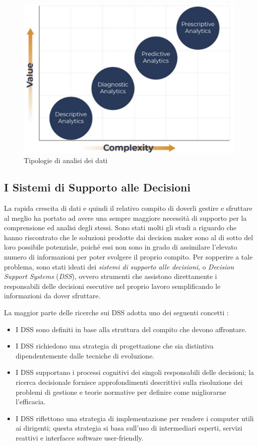 \begin{figure}[H]
    \centering
    \includegraphics[width=0.75\linewidth]{figure/capitolo_2/Analytics Models.pdf}
    \caption{Tipologie di analisi dei dati}
    \label{fig:Analytics Models}
\end{figure}

\subsection{I Sistemi di Supporto alle Decisioni}

La rapida crescita di dati e quindi il relativo compito di doverli gestire e sfruttare al meglio ha portato ad avere una sempre maggiore necessità di supporto per la comprensione ed analisi degli stessi. Sono stati molti gli studi a riguardo che hanno riscontrato che le soluzioni prodotte dai decision maker sono al di sotto del loro possibile potenziale, poiché essi non sono in grado di assimilare l'elevato numero di informazioni per poter svolgere il proprio compito. Per sopperire a tale problema, sono stati ideati dei \textit{sistemi di supporto alle decisioni}, o \textit{Decision Support Systems} (\textit{DSS}), ovvero strumenti che assistono direttamente i responsabili delle decisioni esecutive nel proprio lavoro semplificando le informazioni da dover sfruttare.

La maggior parte delle ricerche sui DSS adotta uno dei seguenti concetti \cite{mit_keen_dss}:

\begin{itemize}
    \item I DSS sono definiti in base alla struttura del compito che devono affrontare.
    \item I DSS richiedono una strategia di progettazione che sia distintiva dipendentemente dalle tecniche di evoluzione.
    \item I DSS supportano i processi cognitivi dei singoli responsabili delle decisioni; la ricerca decisionale fornisce approfondimenti descrittivi sulla risoluzione dei problemi di gestione e teorie normative per definire come migliorarne l'efficacia.
    \item I DSS riflettono una strategia di implementazione per rendere i computer utili ai dirigenti; questa strategia si basa sull'uso di intermediari esperti, servizi reattivi e interfacce software user-friendly.
\end{itemize}


